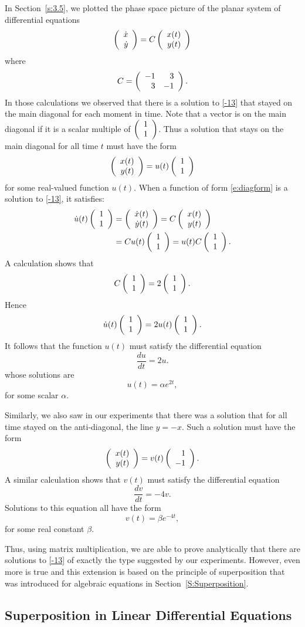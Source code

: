 \documentclass{ximera}
\begin{document}
In Section~\ref{s:3.5}, we plotted the phase space picture 
of the planar system of differential equations
\begin{equation} \label{-13}
\left(\begin{array}{r} \dot{x} \\ \dot{y}\end{array}\right)
= C \left(\begin{array}{r} x(t) \\ y(t)\end{array}\right)
\end{equation}
where
\[
C = \left(\begin{array}{rr} -1 & 3\\ 3 &-1\end{array}\right).
\]
In those calculations we observed that there is a solution to
\eqref{-13} that stayed on the main diagonal for each moment in
time.  Note that a vector is on the main diagonal if it is a
scalar multiple of $\left(\begin{array}{r} 1 \\ 1\end{array}\right)$.  Thus a solution that stays
on the main diagonal for all time $t$ must have the form
\begin{equation} \label{e:diagform}
\left(\begin{array}{r} x(t) \\ y(t)\end{array}\right) = u(t) \left(\begin{array}{r} 1 \\ 1\end{array}\right)
\end{equation}
for some real-valued function $u(t)$.  When a function of form
\eqref{e:diagform} is a solution to \eqref{-13}, it satisfies:
\begin{align*}
  \dot{u}(t)\left(\begin{array}{r} 1 \\ 1\end{array}\right) &= \left(\begin{array}{r} \dot{x}(t) \\ \dot{y}(t)\end{array}\right) 
                            = C \left(\begin{array}{r} x(t) \\ y(t)\end{array}\right) \\
                          &= C u(t)\left(\begin{array}{r} 1 \\ 1\end{array}\right) = u(t) C \left(\begin{array}{r} 1 \\ 1\end{array}\right).
\end{align*}
A calculation shows that
\[
C \left(\begin{array}{r} 1 \\ 1\end{array}\right) = 2 \left(\begin{array}{r} 1 \\ 1\end{array}\right).
\]
Hence
\[
\dot{u}(t) \left(\begin{array}{r} 1 \\ 1\end{array}\right) =  2 u(t) \left(\begin{array}{r} 1 \\ 1\end{array}\right).
\]
It follows that the function $u(t)$ must satisfy the
differential equation
\[
\frac{du}{dt} = 2u.
\]
whose solutions are
\[
u(t) = \alpha e^{2t},
\]
for some scalar $\alpha$.

Similarly, we also saw in our \Matlab experiments that there was
a solution that for all time stayed on the anti-diagonal, the
line $y=-x$.  Such a solution must have the form
\[
\left(\begin{array}{r} x(t) \\ y(t)\end{array}\right) = v(t) \left(\begin{array}{r} 1 \\ -1\end{array}\right).
\]
A similar calculation shows that $v(t)$ must satisfy the
differential equation
\[
\frac{dv}{dt} = -4v.
\]
Solutions to this equation all have the form
\[
v(t) = \beta e^{-4t},
\]
for some real constant $\beta$.

Thus, using matrix multiplication, we are able to prove
analytically that there are solutions to \eqref{-13} of exactly
the type suggested by our \Matlab experiments.  However, even
more is true and this extension is based on the principle of 
superposition that was introduced for algebraic equations in 
Section~\ref{S:Superposition}.  

\subsection*{Superposition in Linear Differential Equations}
\end{document}
